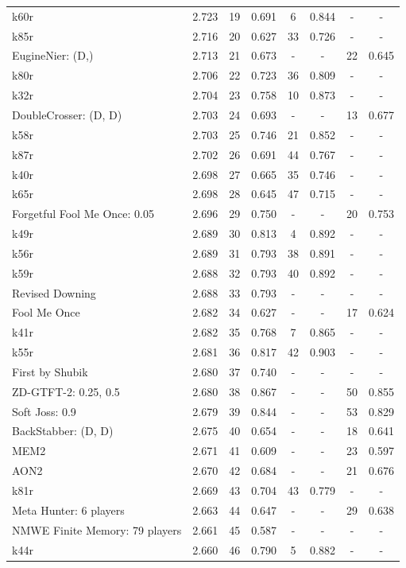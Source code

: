 \begin{tabular}{lccccccc}
k60r & 2.723 & 19 & 0.691 & 6 & 0.844 & - & - \\
k85r & 2.716 & 20 & 0.627 & 33 & 0.726 & - & - \\
EugineNier: (D,) & 2.713 & 21 & 0.673 & - & - & 22 & 0.645 \\
k80r & 2.706 & 22 & 0.723 & 36 & 0.809 & - & - \\
k32r & 2.704 & 23 & 0.758 & 10 & 0.873 & - & - \\
DoubleCrosser: (D, D) & 2.703 & 24 & 0.693 & - & - & 13 & 0.677 \\
k58r & 2.703 & 25 & 0.746 & 21 & 0.852 & - & - \\
k87r & 2.702 & 26 & 0.691 & 44 & 0.767 & - & - \\
k40r & 2.698 & 27 & 0.665 & 35 & 0.746 & - & - \\
k65r & 2.698 & 28 & 0.645 & 47 & 0.715 & - & - \\
Forgetful Fool Me Once: 0.05 & 2.696 & 29 & 0.750 & - & - & 20 & 0.753 \\
k49r & 2.689 & 30 & 0.813 & 4 & 0.892 & - & - \\
k56r & 2.689 & 31 & 0.793 & 38 & 0.891 & - & - \\
k59r & 2.688 & 32 & 0.793 & 40 & 0.892 & - & - \\
Revised Downing & 2.688 & 33 & 0.793 & - & - & - & - \\
Fool Me Once & 2.682 & 34 & 0.627 & - & - & 17 & 0.624 \\
k41r & 2.682 & 35 & 0.768 & 7 & 0.865 & - & - \\
k55r & 2.681 & 36 & 0.817 & 42 & 0.903 & - & - \\
First by Shubik & 2.680 & 37 & 0.740 & - & - & - & - \\
ZD-GTFT-2: 0.25, 0.5 & 2.680 & 38 & 0.867 & - & - & 50 & 0.855 \\
Soft Joss: 0.9 & 2.679 & 39 & 0.844 & - & - & 53 & 0.829 \\
BackStabber: (D, D) & 2.675 & 40 & 0.654 & - & - & 18 & 0.641 \\
MEM2 & 2.671 & 41 & 0.609 & - & - & 23 & 0.597 \\
AON2 & 2.670 & 42 & 0.684 & - & - & 21 & 0.676 \\
k81r & 2.669 & 43 & 0.704 & 43 & 0.779 & - & - \\
Meta Hunter: 6 players & 2.663 & 44 & 0.647 & - & - & 29 & 0.638 \\
NMWE Finite Memory: 79 players & 2.661 & 45 & 0.587 & - & - & - & - \\
k44r & 2.660 & 46 & 0.790 & 5 & 0.882 & - & - \\

\end{tabular}
